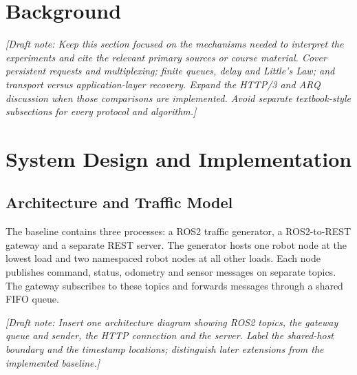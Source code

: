 \documentclass[10pt,a4paper,twocolumn,twoside]{tau-class/tau}
\newcommand{\draftnote}[1]{\par\noindent\textit{[Draft note: #1]}\par}
\begin{document}
\section{Background}
\label{sec:background}

\draftnote{Keep this section focused on the mechanisms needed to interpret
the experiments and cite the relevant primary sources or course material.
Cover persistent requests and multiplexing; finite queues, delay and
Little's Law; and transport versus application-layer recovery. Expand the
HTTP/3 and ARQ discussion when those comparisons are implemented. Avoid
separate textbook-style subsections for every protocol and algorithm.}


\section{System Design and Implementation}
\label{sec:system}

\subsection{Architecture and Traffic Model}
The baseline contains three processes: a ROS2 traffic generator, a
ROS2-to-REST gateway and a separate REST server. The generator hosts one
robot node at the lowest load and two namespaced robot nodes at all other
loads. Each node publishes command, status, odometry and sensor messages
on separate topics. The gateway subscribes to these topics and forwards
messages through a shared FIFO queue.

\draftnote{Insert one architecture diagram showing ROS2 topics, the gateway
queue and sender, the HTTP connection and the server. Label the shared-host
boundary and the timestamp locations; distinguish later extensions from
the implemented baseline.}
\end{document}
